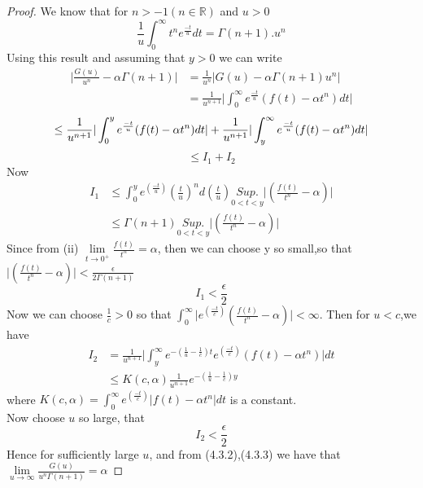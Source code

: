 \begin{proof}
 We know that for $ n>-1 (n \in \mathbb{R}) $ and $ u>0 $
\begin{equation}
\frac{1}{u}\int_{0}^{\infty}t^{n}e^{\frac{-t}{u}}dt=\Gamma(n+1).u^{n}
\end{equation}
Using this result and assuming that $y>0$ we can write
\begin{align*}
\vert {\frac{G(u)}{u^{n}}-\alpha\Gamma(n+1)}\vert&=\frac{1}{u^{n}}\vert {G(u)-\alpha\Gamma(n+1)u^{n}}\vert\\
&=\frac{1}{u^{n+1}}\vert\int_{0}^{\infty}e^{\frac{-t}{u}}(f(t)-\alpha t^{n})dt\vert
\end{align*}
\begin{equation*}
\leq \frac{1}{u^{n+1}}\vert\int_{0}^{y}e^{\frac{-t}{u}}(f(t)-\alpha t^{n})dt\vert + \frac{1}{u^{n+1}}\vert\int_{y}^{\infty}e^{\frac{-t}{u}}(f(t)-\alpha t^{n})dt\vert\\
\end{equation*}
\begin{equation*}
\leq I_{1} + I_{2}
\end{equation*}
Now
\begin{align*}
I_{1}&\leq \int_{0}^{y}e^{(\frac{-t}{u})}(\frac{t}{u})^{n}d(\frac{t}{u})\underset{0<t<y}{Sup.}\vert(\frac{f(t)}{t^{n}}-\alpha )\vert\\
&\leq \Gamma(n+1)\underset{0<t<y}{Sup.}\vert(\frac{f(t)}{t^{n}}-\alpha )\vert
\end{align*}
Since from (ii) $\underset{t\rightarrow 0^{+}}\lim \frac{f(t)}{t^{n}}=\alpha $, then we can choose y so small,so that $ \vert(\frac{f(t)}{t^{n}}-\alpha )\vert  < \frac{\epsilon}{2\Gamma(n+1)} $\\
\hspace{0.5cm}\begin{equation}
I_{1} <\frac{\epsilon}{2} 
\end{equation}
Now we can choose $\frac{1}{c} > 0$ so that $\int_{0}^{\infty}\vert e^{(\frac{-t}{c})}(\frac{f(t)}{t^{n}}-\alpha )\vert < \infty $. Then for $u<c$,we have\\
\begin{align*}
I_{2}&=\frac{1}{u^{n+1}}\vert\int_{y}^{\infty}e^{-(\frac{1}{u}-\frac{1}{c})t}e^{(\frac{-t}{c})}(f(t)-\alpha t^{n})\vert dt\\
&\leq K(c,\alpha) \frac{1}{u^{n+1}}e^{-(\frac{1}{u}-\frac{1}{c})y}
\end{align*}
where $ K(c,\alpha) = \int_{0}^{\infty} e^{(\frac{-t}{c})}\vert f(t)-\alpha t^{n}\vert dt $ is a constant.\\
Now choose $u$ so large, that 
\begin{equation}
I_{2} < \frac{\epsilon}{2}
\end{equation}
Hence for sufficiently large $u$, and from (4.3.2),(4.3.3) we have that
$ \underset{u\rightarrow \infty}\lim \frac{G(u)}{u^{n}\Gamma(n+1)}=\alpha $
\end{proof}
